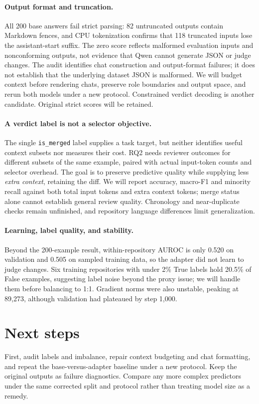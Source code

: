 \documentclass{article}
\begin{document}
\paragraph{Output format and truncation.}
All 200 base answers fail strict parsing: 82 untruncated outputs contain Markdown fences, and CPU tokenization confirms that 118 truncated inputs lose the assistant-start suffix. The zero score reflects malformed evaluation inputs and nonconforming outputs, not evidence that Qwen cannot generate JSON or judge changes. The audit identifies chat construction and output-format failures; it does not establish that the underlying dataset JSON is malformed. We will budget context before rendering chats, preserve role boundaries and output space, and rerun both models under a new protocol. Constrained verdict decoding is another candidate. Original strict scores will be retained.

\paragraph{A verdict label is not a selector objective.}
The single \texttt{is\_merged} label supplies a task target, but neither identifies useful context subsets nor measures their cost. RQ2 needs reviewer outcomes for different subsets of the same example, paired with actual input-token counts and selector overhead. The goal is to preserve predictive quality while supplying less \emph{extra context}, retaining the diff. We will report accuracy, macro-F1 and minority recall against both total input tokens and extra context tokens; merge status alone cannot establish general review quality. Chronology and near-duplicate checks remain unfinished, and repository language differences limit generalization.

\paragraph{Learning, label quality, and stability.} Beyond the 200-example result, within-repository AUROC is only 0.520 on validation and 0.505 on sampled training data, so the adapter did not learn to judge changes. Six training repositories with under 2\% True labels hold 20.5\% of False examples, suggesting label noise beyond the proxy issue; we will handle them before balancing to 1:1. Gradient norms were also unstable, peaking at 89,273, although validation had plateaued by step 1,000.

\section{Next steps}
First, audit labels and imbalance, repair context budgeting and chat formatting, and repeat the base-versus-adapter baseline under a new protocol. Keep the original outputs as failure diagnostics. Compare any more complex predictors under the same corrected split and protocol rather than treating model size as a remedy.
\end{document}
